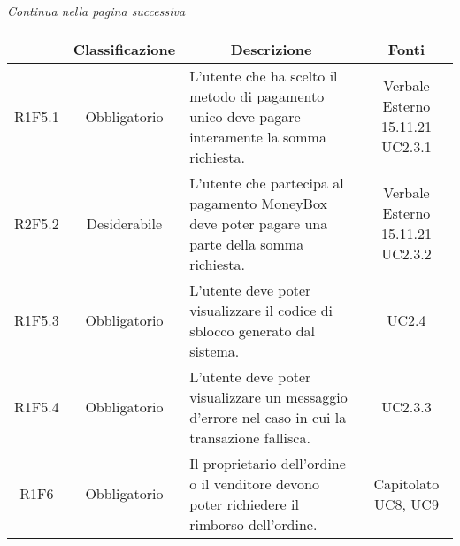 \begin{center}
    \textit{\small Continua nella pagina successiva}
\end{center}
\begin{table}[H]
    \centering
    \renewcommand{\arraystretch}{1.8}
    \begin{tabular}{c | c | p{6cm} | c}
        \rowcolor[HTML]{125E28}
        \multicolumn{1}{c}{\color[HTML]{FFFFFF} \textbf{Codice}}          &
        \multicolumn{1}{c}{\color[HTML]{FFFFFF} \textbf{Classificazione}} &
        \multicolumn{1}{c}{\color[HTML]{FFFFFF} \textbf{Descrizione}}     &
        \multicolumn{1}{c}{\color[HTML]{FFFFFF} \textbf{Fonti}}                                                                                                                                                                                          \\
        \hline
        R1F5.1                                                            & Obbligatorio & L'utente che ha scelto il metodo di pagamento unico deve pagare interamente la somma richiesta.                       & \Shortunderstack{Verbale Esterno 15.11.21\\UC2.3.1\\}      \\
        R2F5.2                                                            & Desiderabile & L'utente che partecipa al pagamento MoneyBox\glo{} deve poter pagare una parte della somma richiesta.                 & \Shortunderstack{Verbale Esterno 15.11.21\\UC2.3.2\\}      \\
        R1F5.3                                                            & Obbligatorio & L'utente deve poter visualizzare il codice di sblocco generato dal sistema.                                           & UC2.4                                 \\
        R1F5.4                                                            & Obbligatorio & L'utente deve poter visualizzare un messaggio d'errore nel caso in cui la transazione fallisca.                       & UC2.3.3                               \\
        R1F6                                                              & Obbligatorio & Il proprietario dell'ordine o il venditore devono poter richiedere il rimborso dell'ordine.                           & \Shortunderstack{Capitolato\\UC8, UC9\\}   \\

\end{tabular}
\end{table}
